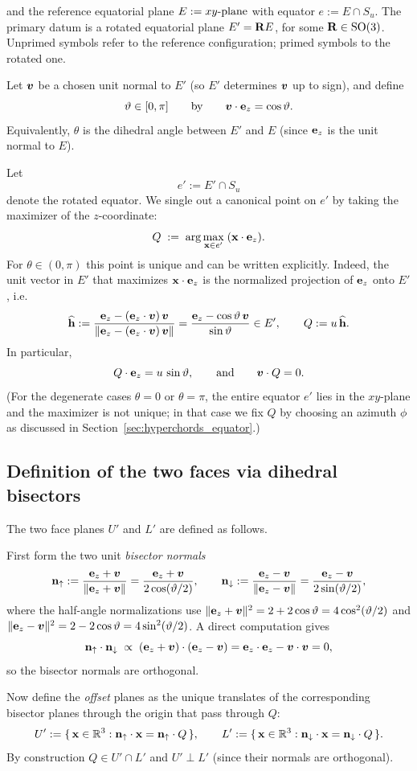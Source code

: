 and the reference equatorial plane $E:=\xyplane$ with equator $e:=E\cap S_u$.
The primary datum is a rotated equatorial plane $E'=\RotMat E$, for some $\RotMat\in\sot$.
Unprimed symbols refer to the reference configuration; primed symbols to the rotated one.

Let $\bm{v}$ be a chosen unit normal to $E'$ (so $E'$ determines $\bm{v}$ up to sign), and define
\[
\vartheta\in[0,\pi]
\qquad\text{by}\qquad
\bm{v}\cdot \mathbf{e}_{z} = \cos\vartheta .
\]
Equivalently, $\theta$ is the dihedral angle between $E'$ and $E$ (since $\mathbf{e}_{z}$ is the unit normal to $E$).

Let
\[
e' := E'\cap S_u
\]
denote the rotated equator. We single out a canonical point on $e'$ by taking the maximizer of the
$z$-coordinate:
\[
Q \;:=\; \arg\max_{\mathbf{x}\in e'} \;(\mathbf{x}\cdot\mathbf{e}_{z}).
\]
For $\theta\in(0,\pi)$ this point is unique and can be written explicitly.
Indeed, the unit vector in $E'$ that maximizes $\mathbf{x}\cdot\mathbf{e}_{z}$ is the normalized projection of $\mathbf{e}_{z}$
onto $E'$, i.e.
\[
\widehat{\mathbf{h}}
:=
\frac{\mathbf{e}_{z}-(\mathbf{e}_{z}\cdot\bm{v})\,\bm{v}}{\lVert\mathbf{e}_{z}-(\mathbf{e}_{z}\cdot\bm{v})\,\bm{v}\rVert}
=
\frac{\mathbf{e}_{z}-\cos\vartheta\,\bm{v}}{\sin\vartheta}
\in E',
\qquad
Q := u\,\widehat{\mathbf{h}}.
\]
In particular,
\[
Q\cdot\mathbf{e}_{z} = u\,\sin\vartheta,
\qquad
\text{and}\qquad
\bm{v}\cdot Q = 0.
\]
(For the degenerate cases $\theta=0$ or $\theta=\pi$, the entire equator $e'$ lies in the $xy$-plane and
the maximizer is not unique; in that case we fix $Q$ by choosing an azimuth $\phi$ as discussed in
Section~\ref{sec:hyperchords_equator}.)

\subsection{Definition of the two faces via dihedral bisectors}
\label{sec:hyperchords_faces}

The two face planes $U'$ and $L'$ are defined as follows.

First form the two unit \emph{bisector normals}
\[
\mathbf{n}_\uparrow := \frac{\mathbf{e}_{z}+\bm{v}}{\lVert\mathbf{e}_{z}+\bm{v}\rVert}
= \frac{\mathbf{e}_{z}+\bm{v}}{2\cos(\vartheta/2)},
\qquad
\mathbf{n}_\downarrow := \frac{\mathbf{e}_{z}-\bm{v}}{\lVert\mathbf{e}_{z}-\bm{v}\rVert}
= \frac{\mathbf{e}_{z}-\bm{v}}{2\sin(\vartheta/2)},
\]
where the half-angle normalizations use $\lVert\mathbf{e}_{z}+\bm{v}\rVert^2 = 2+2\cos\vartheta = 4\cos^2(\vartheta/2)$ and
$\lVert\mathbf{e}_{z}-\bm{v}\rVert^2 = 2-2\cos\vartheta = 4\sin^2(\vartheta/2)$.
A direct computation gives
\[
\mathbf{n}_\uparrow\cdot\mathbf{n}_\downarrow
\;\propto\;
(\mathbf{e}_{z}+\bm{v})\cdot(\mathbf{e}_{z}-\bm{v})=\mathbf{e}_{z}\cdot\mathbf{e}_{z}-\bm{v}\cdot\bm{v}=0,
\]
so the bisector normals are orthogonal.

Now define the \emph{offset} planes as the unique translates of the corresponding bisector planes
through the origin that pass through $Q$:
\[
U' := \{\,\mathbf{x}\in\mathbb{R}^3 : \mathbf{n}_\uparrow\cdot \mathbf{x} = \mathbf{n}_\uparrow\cdot Q\,\},
\qquad
L' := \{\,\mathbf{x}\in\mathbb{R}^3 : \mathbf{n}_\downarrow\cdot \mathbf{x} = \mathbf{n}_\downarrow\cdot Q\,\}.
\]
By construction $Q\in U'\cap L'$ and $U'\perp L'$ (since their normals are orthogonal).

